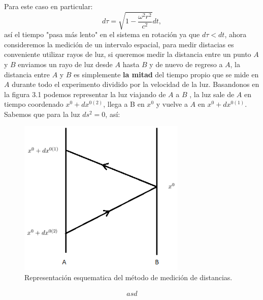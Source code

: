 Para este caso en particular:
\begin{equation}
d\tau=\sqrt{1-\frac{\omega^{2}r^{2}}{c^{2}}}dt,
\end{equation}
así el tiempo "pasa más lento" en el sistema en rotación ya que $d\tau<dt$, ahora consideremos la medición de un intervalo espacial, para medir distacias es conveniente utilizar rayos de luz, si queremos medir la distancia entre un punto $A$ y $B$ enviamos un rayo de luz desde $A$ hasta $B$ y de nuevo de regreso a $A$, la distancia entre $A$ y $B$ es simplemente \textbf{la mitad} del tiempo propio que se mide en $A$ durante todo el experimento dividido por la velocidad de la luz. Basandonos en la figura 3.1 podemos representar la luz viajando de $A$ a $B$ , la luz sale de $A$ en tiempo coordenado $x^{0}+dx^{0(2)}$, llega a B en $x^0$ y vuelve a $A$ en $x^{0}+dx^{0(1)}$. Sabemos que para la luz $ds^2=0$, así:
\begin{figure}[h!]
\centering
\includegraphics[width=8cm]{Imagenes/Fig17}
\caption[Medición de distancias en sistemas de coordenadas no inerciales.]{Representación esquematica del método de medición de distancias.}
\end{figure}
\begin{eqnarray}
asd
\end{eqnarray} 